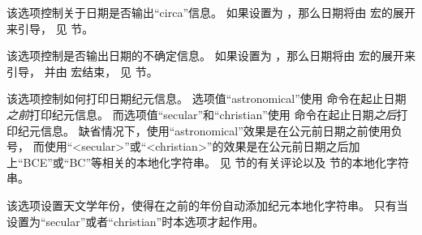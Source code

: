 \begin{optionlist}
该选项控制关于日期是否输出“circa”信息。
如果设置为 ，那么日期将由  宏的展开来引导，
见  节。



该选项控制是否输出日期的不确定信息。
如果设置为 ，那么日期将由  宏的展开来引导，
并由  宏结束，
见  节。



该选项控制如何打印日期纪元信息。
选项值“astronomical”使用  命令在起止日期\emph{之前}打印纪元信息。
而选项值“secular”和“christian”使用  命令在起止日期\emph{之后}打印纪元信息。
缺省情况下，使用“astronomical”效果是在公元前日期之前使用负号，
而使用“<secular>”或“<christian>”的效果是在公元前日期之后加上“BCE”或“BC”等相关的本地化字符串。
见  节的有关评论以及  节的本地化字符串。



该选项设置天文学年份，使得在之前的年份自动添加纪元本地化字符串。
只有当  设置为“secular”或者“christian”时本选项才起作用。




\end{optionlist}
